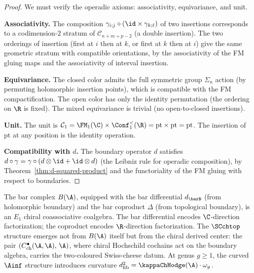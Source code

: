 \begin{proof}
We must verify the operadic axioms: associativity,
equivariance, and unit.

\medskip\noindent
\textbf{Associativity.}
The composition $\gamma_{i;j} \circ (\id \times \gamma_{k;\ell})$
of two insertions corresponds to a codimension-$2$
stratum of $\mathcal{C}_{n+m+p-2}$ (a double insertion).
The two orderings of insertion (first at $i$ then at $k$,
or first at $k$ then at $i$) give the same geometric
stratum with compatible orientations, by the associativity
of the FM gluing maps and the associativity of interval
insertion.

\medskip\noindent
\textbf{Equivariance.}
The closed color admits the full symmetric group
$\Sigma_n$ action (by permuting holomorphic insertion
points), which is compatible with the FM compactification.
The open color has only the identity permutation (the
ordering on $\R$ is fixed). The mixed equivariance
is trivial (no open-to-closed insertions).

\medskip\noindent
\textbf{Unit.}
The unit is $\mathcal{C}_1 = \FM_1(\C) \times
\Conf_1^<(\R) = \mathrm{pt} \times \mathrm{pt}
= \mathrm{pt}$. The insertion of $\mathrm{pt}$ at any
position is the identity operation.

\medskip\noindent
\textbf{Compatibility with $d$.}
The boundary operator $d$ satisfies
$d \circ \gamma = \gamma \circ (d \otimes \id
+ \id \otimes d)$ (the Leibniz rule for operadic
composition), by Theorem~\ref{thm:d-squared-product}
and the functoriality of the FM gluing with respect
to boundaries.
\end{proof}

\begin{corollary}
The bar complex $B(\A)$, equipped with the bar
differential $d_{\barB}$ (from holomorphic boundary)
and the bar coproduct $\Delta$ (from topological
boundary), is an $E_1$ chiral coassociative coalgebra. The bar
differential encodes $\C$-direction factorization;
the coproduct encodes $\R$-direction factorization.
The $\SCchtop$ structure emerges not from $B(\A)$ itself
but from the chiral derived center: the pair
$(C^\bullet_{\mathrm{ch}}(\A,\A),\, \A)$, where
chiral Hochschild cochains act on the boundary algebra,
carries the two-coloured Swiss-cheese datum.
At genus $g \ge 1$, the curved $\Ainf$ structure
introduces curvature $d_{\mathrm{fib}}^2 =
\kappaChHodge(\A) \cdot \omega_g$.
\end{corollary}

